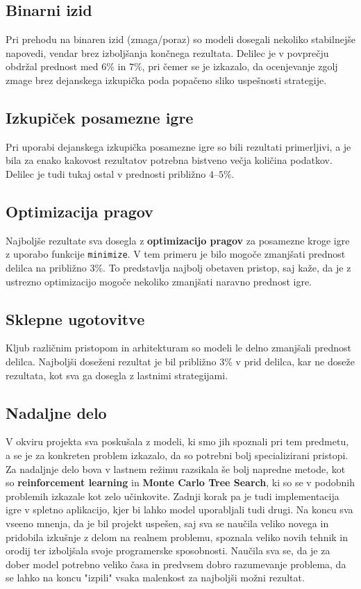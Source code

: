 \documentclass[a4paper,12pt]{article}
\begin{document}
\subsection*{Binarni izid}
Pri prehodu na binaren izid (zmaga/poraz) so modeli dosegali nekoliko stabilnejše napovedi, 
vendar brez izboljšanja končnega rezultata. Delilec je v povprečju obdržal prednost med $6\%$ in $7\%$, 
pri čemer se je izkazalo, da ocenjevanje zgolj zmage brez dejanskega izkupička 
poda popačeno sliko uspešnosti strategije.

\subsection*{Izkupiček posamezne igre}
Pri uporabi dejanskega izkupička posamezne igre so bili rezultati primerljivi, 
a je bila za enako kakovost rezultatov potrebna bistveno večja količina podatkov. 
Delilec je tudi tukaj ostal v prednosti približno $4$--$5\%$.

\subsection*{Optimizacija pragov}
Najboljše rezultate sva dosegla z \textbf{optimizacijo pragov} za posamezne kroge igre 
z uporabo funkcije \texttt{minimize}. V tem primeru je bilo mogoče zmanjšati prednost delilca 
na približno $3\%$. To predstavlja najbolj obetaven pristop, saj kaže, da je z ustrezno optimizacijo 
mogoče nekoliko zmanjšati naravno prednost igre.

\subsection*{Sklepne ugotovitve}
Kljub različnim pristopom in arhitekturam so modeli le delno zmanjšali prednost delilca. 
Najboljši doseženi rezultat je bil približno $3\%$ v prid delilca, kar ne doseže
rezultata, kot sva ga dosegla z lastnimi strategijami.

\subsection*{Nadaljne delo}
V okviru projekta sva poskušala z modeli, ki smo jih spoznali pri tem predmetu, a se je
za konkreten problem izkazalo, da so potrebni bolj specializirani pristopi.
Za nadaljnje delo bova v lastnem režimu razsikala še bolj napredne metode, kot so
\textbf{reinforcement learning} in \textbf{Monte Carlo Tree Search}, ki so se v podobnih problemih izkazale kot zelo učinkovite.
Zadnji korak pa je tudi implementacija igre v spletno aplikacijo, kjer bi lahko model
uporabljali tudi drugi.
Na koncu sva vseeno mnenja, da je bil projekt uspešen, saj sva se naučila veliko novega in pridobila izkušnje z delom na realnem problemu, 
spoznala veliko novih tehnik in orodij ter izboljšala svoje programerske sposobnosti. 
Naučila sva se, da je za dober model potrebno veliko časa in predvsem dobro razumevanje problema,
da se lahko na koncu "izpili" vsaka malenkost za najboljši možni rezultat.
\end{document}
